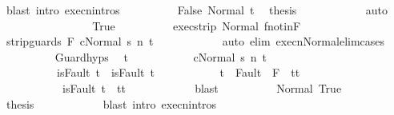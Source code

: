 \begin{isabellebody}
\ {\isacharparenleft}blast\ intro{\isacharcolon}\ execn{\isachardot}intros{\isacharparenright}\isanewline
\ \ \ \ \ \ \ \ \isamarkupfalse%
\ False\ Normal\ t\ \isamarkupfalse%
\ {\isacharquery}thesis\isanewline
\ \ \ \ \ \ \ \ \ \ \isamarkupfalse%
\ auto\isanewline
\ \ \ \ \ \ \isamarkupfalse%
\isanewline
\ \ \ \ \ \ \ \ \isamarkupfalse%
\ True\isanewline
\ \ \ \ \ \ \ \ \isamarkupfalse%
\ exec{\isacharunderscore}strip\ Normal\ f{\isacharunderscore}notin{\isacharunderscore}F\isanewline
\ \ \ \ \ \ \ \ \isamarkupfalse%
\ {\isachardoublequoteopen}{\isasymGamma}{\isasymturnstile}{\isasymlangle}strip{\isacharunderscore}guards\ F\ c{\isacharcomma}Normal\ s{\isacharprime}{\isasymrangle}\ {\isacharequal}n{\isasymRightarrow}\ t{\isachardoublequoteclose}\isanewline
\ \ \ \ \ \ \ \ \ \ \isamarkupfalse%
\ {\isacharparenleft}auto\ elim{\isacharcolon}\ execn{\isacharunderscore}Normal{\isacharunderscore}elim{\isacharunderscore}cases{\isacharparenright}\isanewline
\ \ \ \ \ \ \ \ \isamarkupfalse%
\ Guard{\isachardot}hyps\ \isamarkupfalse%
\ t{\isacharprime}\ \isanewline
\ \ \ \ \ \ \ \ \ \ {\isachardoublequoteopen}{\isasymGamma}{\isasymturnstile}{\isasymlangle}c{\isacharcomma}Normal\ s{\isacharprime}{\isasymrangle}\ {\isacharequal}n{\isasymRightarrow}\ t{\isacharprime}{\isachardoublequoteclose}\ \isanewline
\ \ \ \ \ \ \ \ \ \ {\isachardoublequoteopen}isFault\ t\ {\isasymlongrightarrow}\ isFault\ t{\isacharprime}{\isachardoublequoteclose}\ \isanewline
\ \ \ \ \ \ \ \ \ \ {\isachardoublequoteopen}t{\isacharprime}\ {\isasymin}\ Fault\ {\isacharbackquote}\ {\isacharparenleft}{\isacharminus}F{\isacharparenright}\ {\isasymlongrightarrow}\ t{\isacharprime}{\isacharequal}t{\isachardoublequoteclose}\ \isanewline
\ \ \ \ \ \ \ \ \ \ {\isachardoublequoteopen}{\isasymnot}\ isFault\ t{\isacharprime}\ {\isasymlongrightarrow}\ t{\isacharprime}{\isacharequal}t{\isachardoublequoteclose}\isanewline
\ \ \ \ \ \ \ \ \ \ \isamarkupfalse%
\ blast\isanewline
\ \ \ \ \ \ \ \ \isamarkupfalse%
\ Normal\ True\isanewline
\ \ \ \ \ \ \ \ \isamarkupfalse%
\ {\isacharquery}thesis\isanewline
\ \ \ \ \ \ \ \ \ \ \isamarkupfalse%
\ {\isacharparenleft}blast\ intro{\isacharcolon}\ execn{\isachardot}intros{\isacharparenright}\isanewline
\ \ \ \ \ \ \isamarkupfalse%
\isanewline
\ \ \ \ \isamarkupfalse%

\end{isabellebody}
